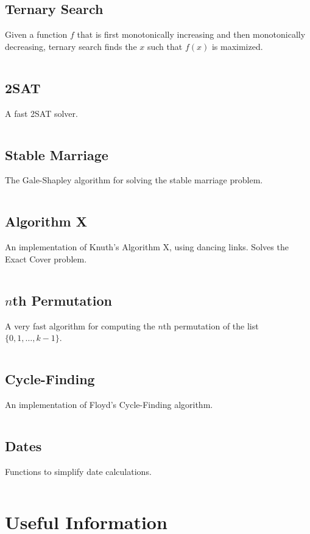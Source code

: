 \documentclass[9pt,a4paper,twocolumn,landscape,oneside]{amsart}
\newcommand{\code}[1]{\inputminted{cpp}{_code/#1}}
\begin{document}
    \subsection{Ternary Search}
        Given a function $f$ that is first monotonically increasing and then
        monotonically decreasing, ternary search finds the $x$ such that $f(x)$ is
        maximized.
        \code{other/ternary_search_continuous.cpp}

    \subsection{2SAT}
        A fast 2SAT solver.
        \code{other/two_sat.cpp}

    \subsection{Stable Marriage}
        The Gale-Shapley algorithm for solving the stable marriage problem.
        \code{other/stable_marriage.cpp}

    \subsection{Algorithm X}
        An implementation of Knuth's Algorithm X, using dancing links. Solves the Exact Cover problem.
        \code{other/algorithm_x.cpp}

    \subsection{$n$th Permutation}
        A very fast algorithm for computing the $n$th permutation of the list
        $\{0,1,\ldots,k-1\}$.
        \code{other/nth_permutation.cpp}

    \subsection{Cycle-Finding}
        An implementation of Floyd's Cycle-Finding algorithm.
        \code{other/floyds_algorithm.cpp}

    \subsection{Dates}
        Functions to simplify date calculations.
        \code{other/dates.cpp}


\section{Useful Information}
\end{document}
